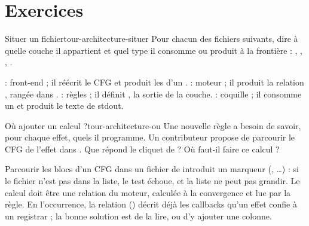 \section{Exercices}
\label{sec:tour-architecture-exercices}

\begin{exercice}{Situer un fichier}{tour-architecture-situer}
Pour chacun des fichiers suivants, dire à quelle couche il appartient et quel type il consomme ou produit à la frontière : , , , .
\end{exercice}
\begin{solution}
 : front-end ; il réécrit le CFG et produit les  d'un .  : moteur ; il produit la relation , rangée dans .  : règles ; il définit , la sortie de la couche.  : coquille ; il consomme un  et produit le texte de stdout.
\end{solution}

\begin{exercice}{Où ajouter un calcul ?}{tour-architecture-ou}
Une nouvelle règle a besoin de savoir, pour chaque effet, quels  il programme. Un contributeur propose de parcourir le CFG de l'effet dans . Que répond le cliquet de  ? Où faut-il faire ce calcul ?
\end{exercice}
\begin{solution}
Parcourir les blocs d'un CFG dans un fichier de  introduit un marqueur (, \ldots) : si le fichier n'est pas dans la liste, le test échoue, et la liste ne peut pas grandir. Le calcul doit être une relation du moteur, calculée à la convergence et lue par la règle. En l'occurrence, la relation  () décrit déjà les callbacks qu'un effet confie à un registrar ; la bonne solution est de la lire, ou d'y ajouter une colonne.
\end{solution}

